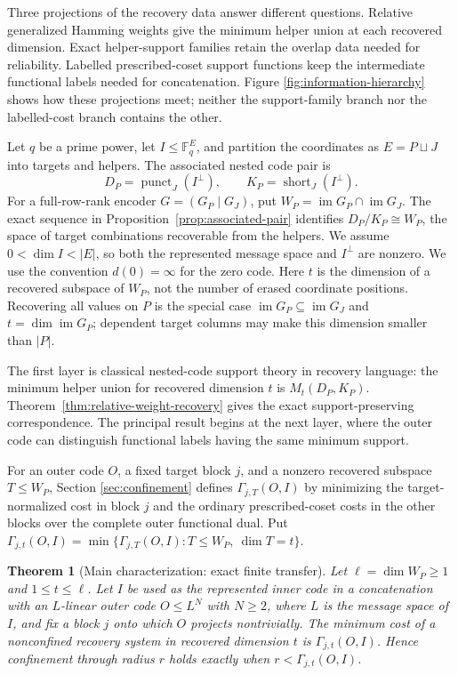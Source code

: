 \documentclass[11pt]{article}
\newtheorem{theorem}{Theorem}[section]
\theoremstyle{definition}
\newcommand{\F}{\mathbb F}
\begin{document}
Three projections of the recovery data answer different questions.  Relative
generalized Hamming weights give the minimum helper union at each recovered
dimension.  Exact helper-support families retain the overlap data needed for
reliability.  Labelled prescribed-coset support functions keep the
intermediate functional labels needed for concatenation.  Figure
\ref{fig:information-hierarchy} shows how these projections meet; neither the
support-family branch nor the labelled-cost branch contains the other.



Let $q$ be a prime power, let $I\leq\F_q^E$, and partition the coordinates as
$E=P\sqcup J$ into targets and helpers.  The associated nested code pair is
\[
 D_P=\operatorname{punct}_J(I^\perp),
 \qquad K_P=\operatorname{short}_J(I^\perp).
\]
For a full-row-rank encoder $G=(G_P\mid G_J)$, put
$W_P=\operatorname{im}G_P\cap\operatorname{im}G_J$.
The exact sequence in Proposition~\ref{prop:associated-pair} identifies
$D_P/K_P\cong W_P$, the space of target combinations recoverable from the
helpers.
We assume $0<\dim I<|E|$, so both the represented message space and
$I^\perp$ are nonzero.
We use the convention $d(0)=\infty$ for the zero code.
Here $t$ is the dimension of a recovered subspace of $W_P$, not the number
of erased coordinate positions.  Recovering all values on $P$ is the special
case $\operatorname{im}G_P\subseteq\operatorname{im}G_J$ and
$t=\dim\operatorname{im}G_P$; dependent target columns may make this dimension
smaller than $|P|$.

The first layer is classical nested-code support theory in recovery language:
the minimum helper union for recovered dimension $t$ is
$M_t(D_P,K_P)$.  Theorem~\ref{thm:relative-weight-recovery} gives the exact
support-preserving correspondence.  The principal result begins at the next
layer, where the outer code can distinguish functional labels having the same
minimum support.

For an outer code $O$, a fixed target block $j$, and a nonzero recovered
subspace $T\leq W_P$, Section
\ref{sec:confinement} defines $\Gamma_{j,T}(O,I)$ by minimizing the
target-normalized cost in block $j$ and the ordinary prescribed-coset costs in
the other blocks over the complete outer functional dual.  Put
$\Gamma_{j,t}(O,I)=\min\{\Gamma_{j,T}(O,I):T\leq W_P,\ \dim T=t\}$.

\begin{theorem}[Main characterization: exact finite transfer]
\label{thm:main}
%
%
Let $\ell=\dim W_P\geq1$ and $1\leq t\leq\ell$.  Let $I$ be used as the
represented inner code in a concatenation with an
$L$-linear outer code $O\leq L^N$ with $N\geq2$, where $L$ is the message space of $I$,
and fix a block $j$ onto which $O$ projects nontrivially.  The minimum cost of a
nonconfined recovery system in recovered dimension $t$ is
$\Gamma_{j,t}(O,I)$.  Hence confinement through radius $r$ holds exactly when
$r<\Gamma_{j,t}(O,I)$.
\end{theorem}
\end{document}
